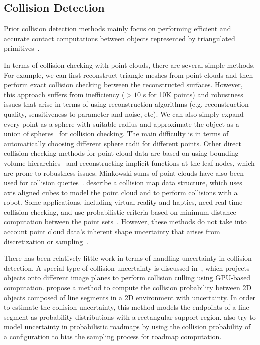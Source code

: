\subsection{Collision Detection}
Prior collision detection methods mainly focus on performing efficient and accurate contact computations between objects represented by triangulated primitives~\cite{LM03}.

In terms of collision checking with point clouds, there are several simple methods. For example,
we can first reconstruct triangle meshes from point clouds and then perform exact collision checking between the reconstructed surfaces.
However, this approach suffers from inefficiency ($>10$ s for 10K points) and robustness issues that arise in terms of using reconstruction algorithms (e.g. reconstruction quality, sensitiveness to parameter and noise, etc). We can also simply expand every point as a sphere with suitable radius and approximate the object as a union of spheres~\cite{Hubbard:1996} for collision checking. The main difficulty is in terms of automatically choosing different sphere radii for different points. Other direct collision checking methods for point cloud data are based on using bounding volume hierarchies~\cite{Jan:2004,Sternemann:2007} and reconstructing implicit functions at the leaf nodes, which are prone to robustness issues. Minkowski sums of point clouds have also been used for collision queries~\cite{Lien:2007}. \cite{Ioan:2010} describe a collision map data structure, which uses axis aligned cubes to model the point cloud and to perform collisions with a robot.
Some applications, including virtual reality and haptics, need real-time collision checking, and use probabilistic criteria based on minimum distance computation between the point sets~\cite{Lee:haptics:2007}. However, these methods do not take into account point cloud data's inherent shape uncertainty that arises from discretization or sampling~\cite{Pauly:2004}.

There has been relatively little work in terms of handling uncertainty in collision detection. A special type of collision uncertainty is discussed in~\cite{Govindaraju:2006:VRST}, which projects objects onto different image planes to perform collision culling using GPU-based computation. \cite{Guibas:wafr2009} propose a method to compute the collision probability between 2D objects composed of line segments in a 2D environment with uncertainty. In order to estimate the collision uncertainty, this method models the endpoints of a line segment as probability distributions with a rectangular support region. \cite{Missiuro:2006} also try to model uncertainty in probabilistic roadmaps by using the collision probability of a configuration to bias the sampling process for roadmap computation.


